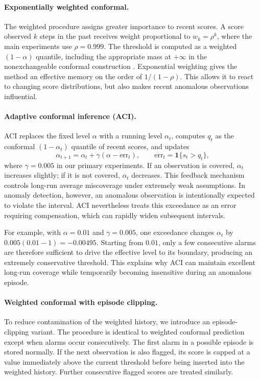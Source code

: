 \documentclass[11pt]{article}
\theoremstyle{definition}
\theoremstyle{remark}
\newcommand{\ind}[1]{\mathbf{1}\{#1\}}
\begin{document}
\paragraph{Exponentially weighted conformal.}
The weighted procedure assigns greater importance to recent scores. A score observed $k$ steps in the past receives weight proportional to $w_k = \rho^k$, where the main experiments use $\rho = 0.999$. The threshold is computed as a weighted $(1-\alpha)$ quantile, including the appropriate mass at $+\infty$ in the nonexchangeable conformal construction \cite{barber2023conformal}. Exponential weighting gives the method an effective memory on the order of $1/(1-\rho)$. This allows it to react to changing score distributions, but also makes recent anomalous observations influential.

\paragraph{Adaptive conformal inference (ACI).}
ACI \cite{gibbs2021adaptive} replaces the fixed level $\alpha$ with a running level $\alpha_t$, computes $q_t$ as the conformal $(1-\alpha_t)$ quantile of recent scores, and updates
\[
  \alpha_{t+1} = \alpha_t + \gamma(\alpha - \mathrm{err}_t),
  \qquad \mathrm{err}_t = \ind{s_t > q_t},
\]
where $\gamma = 0.005$ in our primary experiments. If an observation is covered, $\alpha_t$ increases slightly; if it is not covered, $\alpha_t$ decreases. This feedback mechanism controls long-run average miscoverage under extremely weak assumptions. In anomaly detection, however, an anomalous observation is intentionally expected to violate the interval. ACI nevertheless treats this exceedance as an error requiring compensation, which can rapidly widen subsequent intervals.

For example, with $\alpha = 0.01$ and $\gamma = 0.005$, one exceedance changes $\alpha_t$ by $0.005(0.01 - 1) = -0.00495$. Starting from $0.01$, only a few consecutive alarms are therefore sufficient to drive the effective level to its boundary, producing an extremely conservative threshold. This explains why ACI can maintain excellent long-run coverage while temporarily becoming insensitive during an anomalous episode.

\paragraph{Weighted conformal with episode clipping.}
To reduce contamination of the weighted history, we introduce an episode-clipping variant. The procedure is identical to weighted conformal prediction except when alarms occur consecutively. The first alarm in a possible episode is stored normally. If the next observation is also flagged, its score is capped at a value immediately above the current threshold before being inserted into the weighted history. Further consecutive flagged scores are treated similarly.
\end{document}
